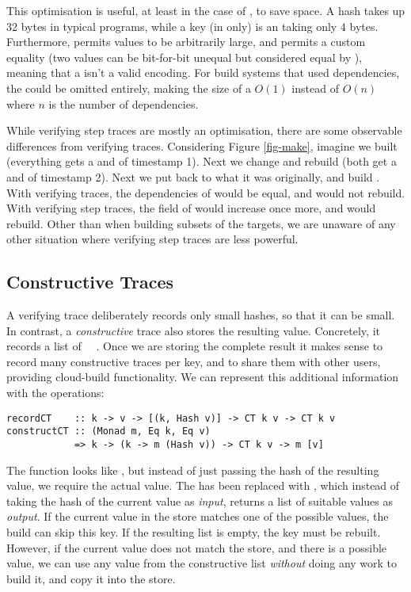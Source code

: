 This optimisation is useful, at least in the case of \Shake, to save space. A hash takes up 32 bytes in typical programs, while a key (in \Shake only) is an  taking only 4 bytes. Furthermore, \Shake permits values to be arbitrarily large, and permits a custom equality (two values can be bit-for-bit unequal but considered equal by \Shake), meaning that a  isn't a valid encoding. For build systems that used  dependencies, the  could be omitted entirely, making the size of a  $O(1)$ instead of $O(n)$ where $n$ is the number of dependencies.

While verifying step traces are mostly an optimisation, there are some observable differences from verifying traces. Considering Figure \ref{fig-make}, imagine we built  (everything gets a  and  of timestamp 1). Next we change  and rebuild  (both get a  and  of timestamp 2). Next we put  back to what it was originally, and build . With verifying traces, the dependencies of  would be equal, and  would not rebuild. With verifying step traces, the  field of  would increase once more, and  would rebuild. Other than when building subsets of the targets, we are unaware of any other situation where verifying step traces are less powerful.

\subsection{Constructive Traces}\label{sec-constructive-traces}

A verifying trace deliberately records only small hashes, so that it can be small.
In contrast, a \emph{constructive} trace also stores the resulting value. Concretely,
it records a list of ~~.
Once we are storing the complete result it makes sense
to record many constructive traces per key, and to share them with other users,
providing cloud-build functionality. We can represent this additional
information with the operations:

\begin{verbatim}
recordCT    :: k -> v -> [(k, Hash v)] -> CT k v -> CT k v
constructCT :: (Monad m, Eq k, Eq v)
            => k -> (k -> m (Hash v)) -> CT k v -> m [v]
\end{verbatim}

\noindent
The function  looks like , but instead of just passing
the hash of the resulting value, we require the actual value. The 
has been replaced with , which instead of taking the hash of the
current value as \emph{input}, returns a list of suitable values as \emph{output}.
If the current value in the store matches one of the possible values, the build
can skip this key. If the resulting list is empty, the key must be rebuilt.
However, if the current value does not match the store, and there is a possible
value, we can use any value from the constructive list \emph{without} doing any
work to build it, and copy it into the store.


